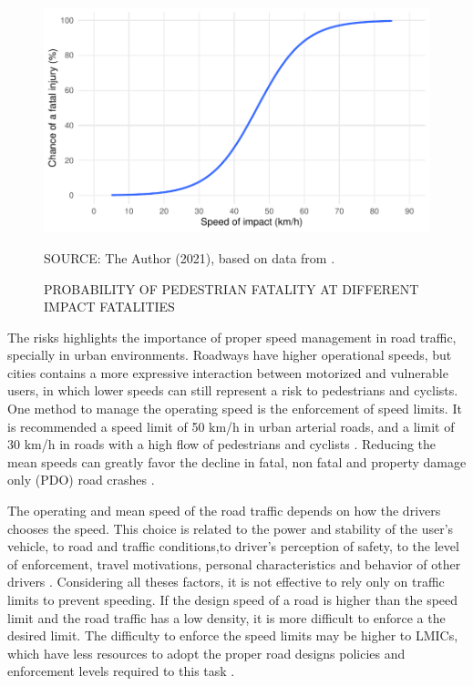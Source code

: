 \begin{figure}[!htbp]
    \centering\footnotesize
    \captionsetup{font=footnotesize}
    \caption{PROBABILITY OF PEDESTRIAN FATALITY AT DIFFERENT IMPACT FATALITIES}
    \includegraphics{fig/ash.pdf}
    \label{fig:ash}
    \par SOURCE: The Author (2021), based on data from \textcite{Ashton1980}.
\end{figure}


The risks highlights the importance of proper speed management in road traffic, specially in urban environments. Roadways have higher operational speeds, but cities contains a more expressive interaction between motorized and vulnerable users, in which lower speeds can still represent a risk to pedestrians and cyclists. One method to manage the operating speed is the enforcement of speed limits. It is recommended a speed limit of 50 km/h in urban arterial roads, and a limit of 30 km/h in roads with a high flow of pedestrians and cyclists \cite{WHO2008}. Reducing the mean speeds can greatly favor the decline in fatal, non fatal and property damage only (PDO) road crashes \cite{Elvik2013}. 


The operating and mean speed of the road traffic depends on how the drivers chooses the speed. This choice is related to the power and stability of the user's vehicle, to road and traffic conditions,to  driver's perception of safety, to the level of enforcement, travel motivations, personal characteristics and behavior of other drivers \cite{Mohan2016a, Shinar2017}. Considering all theses factors, it is not effective to rely only on traffic limits to prevent speeding. If the design speed of a road is higher than the speed limit and the road traffic has a low density, it is more difficult to enforce a the desired limit. The difficulty to enforce the speed limits may be higher to LMICs, which have less resources to adopt the proper road designs policies and enforcement levels required to this task \cite{Mohan2016a}. 

